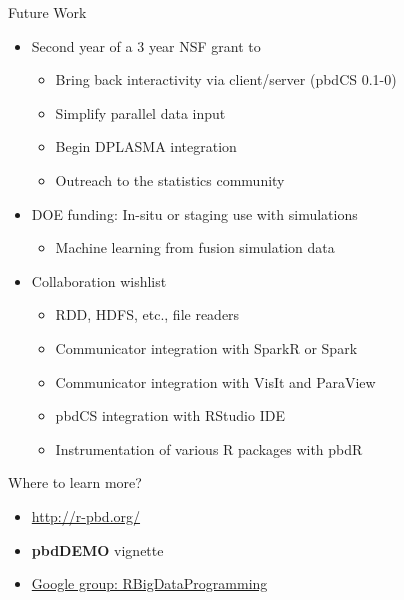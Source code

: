 \begin{frame}
  \begin{block}{Future Work}
  \begin{itemize}
    \item Second year of a 3 year NSF grant to
      \begin{itemize}
      \item Bring back interactivity via client/server (pbdCS 0.1-0)
      \item Simplify parallel data input
      \item Begin DPLASMA integration
      \item Outreach to the statistics community
      \end{itemize}
    \item DOE funding: In-situ or staging use with simulations
      \begin{itemize}
      \item Machine learning from fusion simulation data
      \end{itemize}
    \item Collaboration wishlist
      \begin{itemize}
      \item RDD, HDFS, etc., file readers
      \item Communicator integration with SparkR or Spark
      \item Communicator integration with VisIt and ParaView
      \item pbdCS integration with RStudio IDE
      \item Instrumentation of various R packages with pbdR
      \end{itemize}
  \end{itemize}
  \end{block}
\end{frame}

\begin{frame}
  \begin{block}{Where to learn more?}
  \begin{itemize}
    \item \url{http://r-pbd.org/}
    \item \textbf{pbdDEMO} vignette
    \item \url{Google group: RBigDataProgramming}
  \end{itemize}
  \end{block}
\end{frame}

